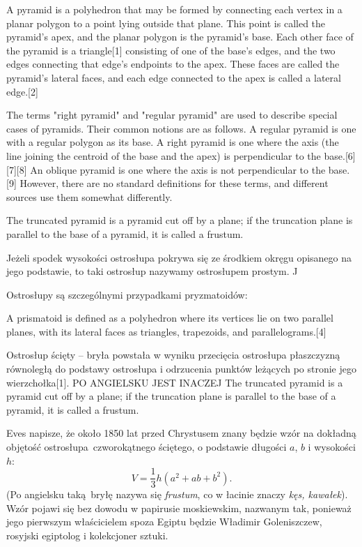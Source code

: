 
\begin{definition}[ostrosłup]
    A pyramid is a polyhedron that may be formed by connecting each vertex in a planar polygon to a point lying outside that plane. This point is called the pyramid's apex, and the planar polygon is the pyramid's base. Each other face of the pyramid is a triangle[1] consisting of one of the base's edges, and the two edges connecting that edge's endpoints to the apex. These faces are called the pyramid's lateral faces, and each edge connected to the apex is called a lateral edge.[2] 
\end{definition}

The terms "right pyramid" and "regular pyramid" are used to describe special cases of pyramids. Their common notions are as follows. A regular pyramid is one with a regular polygon as its base. A right pyramid is one where the axis (the line joining the centroid of the base and the apex) is perpendicular to the base.[6][7][8] An oblique pyramid is one where the axis is not perpendicular to the base.[9] However, there are no standard definitions for these terms, and different sources use them somewhat differently.

The truncated pyramid is a pyramid cut off by a plane; if the truncation plane is parallel to the base of a pyramid, it is called a frustum.

Jeżeli spodek wysokości ostrosłupa pokrywa się ze środkiem okręgu opisanego na jego podstawie, to taki ostrosłup nazywamy ostrosłupem prostym. J


Ostrosłupy są szczególnymi przypadkami pryzmatoidów:

\begin{definition}
A prismatoid is defined as a polyhedron where its vertices lie on two parallel planes, with its lateral faces as triangles, trapezoids, and parallelograms.[4] \end{definition}

Ostrosłup ścięty – bryła powstała w wyniku przecięcia ostrosłupa płaszczyzną równoległą do podstawy ostrosłupa i odrzucenia punktów leżących po stronie jego wierzchołka[1].
PO ANGIELSKU JEST INACZEJ
The truncated pyramid is a pyramid cut off by a plane; if the truncation plane is parallel to the base of a pyramid, it is called a frustum.



Eves \cite[s.4]{eves1_1972} napisze, że około 1850 lat przed Chrystusem znany będzie wzór na dokładną objętość ostrosłupa czworokątnego ściętego, o podstawie długości $a$, $b$ i wysokości $h$:
\begin{equation}
	V = \frac 1 3 h (a^2 + ab + b^2).
\end{equation}
(Po angielsku taką bryłę nazywa się \emph{frustum}, co w łacinie znaczy \emph{kęs, kawałek}).
Wzór pojawi się bez dowodu w papirusie moskiewskim, nazwanym tak, ponieważ jego pierwszym właścicielem spoza Egiptu będzie Władimir Goleniszczew, rosyjski egiptolog i kolekcjoner sztuki.
%






